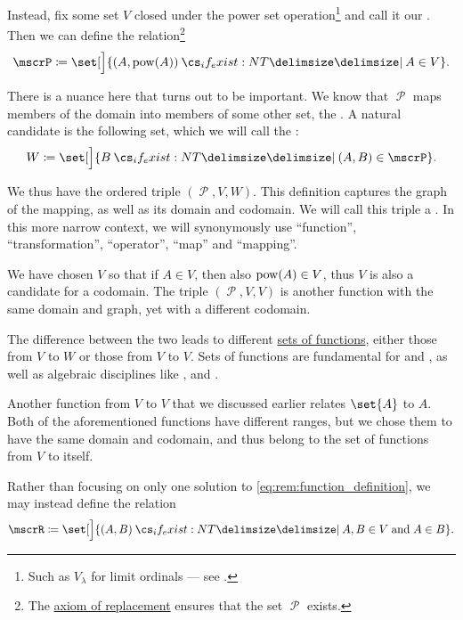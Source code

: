 \begin{remark}
  Instead, fix some set \( V \) closed under the power set operation\footnote{Such as \( V_\lambda \) for limit ordinals --- see .} and call it our . Then we can define the relation\footnote{The \hyperref[def:zfc/replacement]{axiom of replacement} ensures that the set \( \mscrP \) exists.}
  \begin{equation*}
    \mscrP \coloneqq \set[\Big]{ (A, \pow(A)) \given* A \in V }.
  \end{equation*}

  There is a nuance here that turns out to be important. We know that \( \mscrP \) maps members of the domain into members of some other set, the . A natural candidate is the following set, which we will call the :
  \begin{equation*}
    W \coloneqq \set[\Big]{ B \given* (A, B) \in \mscrP }.
  \end{equation*}

  We thus have the ordered triple \( (\mscrP, V, W) \). This definition captures the graph of the mapping, as well as its domain and codomain. We will call this triple a . In this more narrow context, we will synonymously use \enquote{function}, \enquote{transformation}, \enquote{operator}, \enquote{map} and \enquote{mapping}.

  We have chosen \( V \) so that if \( A \in V \), then also \( \operatorname{pow}(A) \in V \), thus \( V \) is also a candidate for a codomain. The triple \( (\mscrP, V, V) \) is another function with the same domain and graph, yet with a different codomain.

  The difference between the two leads to different \hyperref[def:function/set_of_functions]{sets of functions}, either those from \( V \) to \( W \) or those from \( V \) to \( V \). Sets of functions are fundamental for  and , as well as algebraic disciplines like ,  and .

  Another function from \( V \) to \( V \) that we discussed earlier relates \( \set{ A } \) to \( A \). Both of the aforementioned functions have different ranges, but we chose them to have the same domain and codomain, and thus belong to the set of functions from \( V \) to itself.

  Rather than focusing on only one solution to \eqref{eq:rem:function_definition}, we may instead define the relation
  \begin{equation*}
    \mscrR \coloneqq \set[\Big]{ (A, B) \given* A, B \in V \T{and} A \in B }.
  \end{equation*}


\end{remark}
